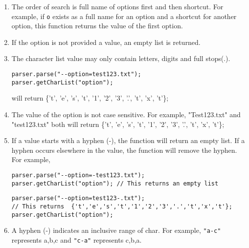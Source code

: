 \documentclass{article}
\begin{document}
\begin{enumerate}
\item The order of search is full name of options first and then
  shortcut. For example, if \lstinline{o} exists as a full name for an
  option and a shortcut for another option, this function returns the
  value of the first option.
\item If the option is not provided a value, an empty list is
  returned.
\item The character list value may only contain letters, digits and
  full stops(.).
\begin{lstlisting}
parser.parse("--option=test123.txt");
parser.getCharList("option");
\end{lstlisting}
will return \{'t', 'e', 's', 't', '1', '2', '3', '.', 't', 'x', 't'\};
\item The value of the option is not case sensitive. For example,
  "Test123.txt" and "test123.txt" both will return \{'t', 'e', 's',
  't', '1', '2', '3', '.', 't', 'x', 't'\};
\item If a value starts with a hyphen (-), the function will return an
  empty list. If a hyphen occurs elsewhere in the value, the function
  will remove the hyphen. For example,
    
\begin{lstlisting}
parser.parse("--option=-test123.txt");
parser.getCharList("option"); // This returns an empty list
\end{lstlisting}
   
\begin{lstlisting}
parser.parse("--option=test123-.txt");
// This returns  {'t','e','s','t','1','2','3','.','t','x','t'};
parser.getCharList("option");
\end{lstlisting}
   
\item A hyphen (-) indicates an inclusive range of char. For example,
  \lstinline{"a-c"} represents a,b,c and \lstinline{"c-a"} represents c,b,a.
\end{enumerate}
\end{document}

